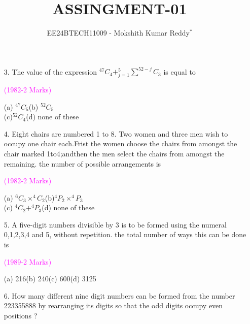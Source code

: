\documentclass[journal,12pt,twocolumn]{IEEEtran}
\theoremstyle{remark}
\begin{document}

\vspace{3cm}

\title{ASSINGMENT-01}
\author{EE24BTECH11009 - Mokshith Kumar Reddy$^{*}$%
}
\maketitle
\newpage
\bigskip




\begin{enumerate}


\section*{\colorbox{lightgray}{C.}\colorbox{magenta}{MCQs with One Correct Answer}}
\item[3.] The value of the expression $^{47}C_4 + ^5_{j=1}\sum ^{52-j}C_3$ is equal to\begin{flushright}\textcolor{magenta}{(1982-2 Marks)}\end{flushright}
(a) $^{47}C_5$\quad\quad(b) $^{52}C_5$\\
(c)$^{52}C_4$\quad\quad(d) none of these\\
\item[4.]Eight chairs are numbered 1 to 8. Two women and three men wish to occupy one chair each.Frist the women choose the chairs from amongst the chair marked 1to4;andthen the men select the chairs from amongst the remaining. the number of possible arrangements is\\
\begin{flushright}
    \textcolor{magenta}{(1982-2 Marks)}
\end{flushright}
(a) $^6C_3\times^4C_2$\quad\quad(b)$^4P_2\times^4P_3$\\
(c) $^4C_2+^4P_3$\quad\quad(d) none of these\\[4pt]
\item[5.]A five-digit numbers divisible by 3 is to be formed using the numeral 0,1,2,3,4 and 5, without repetition. the total number of ways this can be done is\\
\begin{flushright}
    \textcolor{magenta}{(1989-2 Marks)}
\end{flushright}
(a) 216\quad(b) 240\quad(c) 600\quad(d) 3125\\[4pt]
\item[6.]How many different nine digit numbers can be formed from the number 223355888 by rearranging its digits so that the odd digits occupy even positions ?\\

\end{enumerate}
\end{document}
